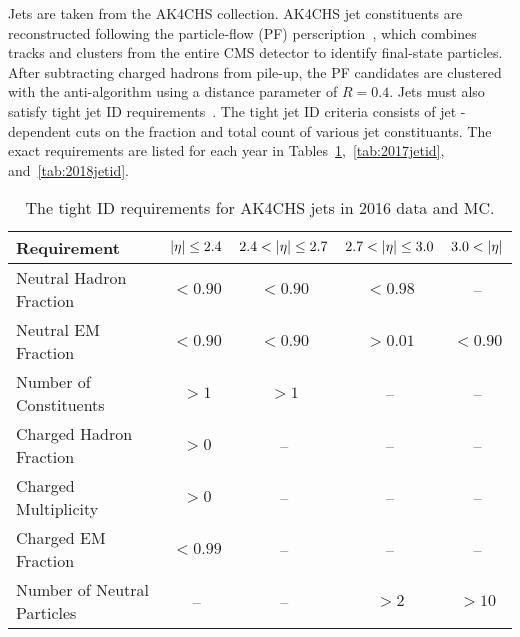 Jets are taken from the AK4CHS collection. AK4CHS jet constituents are reconstructed following the particle-flow (PF) perscription~\cite{pf_algos}, which combines tracks and clusters from the entire CMS detector to identify final-state particles. After subtracting charged hadrons from pile-up, the PF candidates are clustered with the anti-\kt algorithm using a distance parameter of $R = 0.4$. Jets must also satisfy tight jet ID requirements~\cite{jetID}. The tight jet ID criteria consists of jet \pseudorap-dependent cuts on the fraction and total count of various jet constituants. The exact requirements are listed for each year in Tables~\ref{tab:2016jetid},~\ref{tab:2017jetid}, and~\ref{tab:2018jetid}.

\begin{table}[H]
    \caption{The tight ID requirements for AK4CHS jets in 2016 data and MC.}
    \begin{center}
        \begin{tabular}{lcccc}\hline\hline
            Requirement                 & $\lvert \eta \rvert \leq 2.4$   & $2.4 < \lvert \eta \rvert \leq 2.7$   & $2.7 < \lvert \eta \rvert \leq 3.0$   & $3.0 < \lvert \eta \rvert$ \\ \hline
            Neutral Hadron Fraction     & $< 0.90$                  & $< 0.90$                  & $< 0.98$                  & -- \\
            Neutral EM Fraction         & $< 0.90$                  & $< 0.90$                  & $> 0.01$                  & $< 0.90$ \\
            Number of Constituents      & $> 1$                     & $> 1$                     & --                         & -- \\	
            Charged Hadron Fraction     & $> 0$                     & --                         & --                         & -- \\
            Charged Multiplicity        & $> 0$                     & --                         & --                         & -- \\
            Charged EM Fraction         & $< 0.99$                  & --                         & --                         & -- \\ 
            Number of Neutral Particles & --                        & --                         & $> 2$                     & $> 10$ \\\hline\hline
        \end{tabular}
        \label{tab:2016jetid}
    \end{center}
\end{table}

